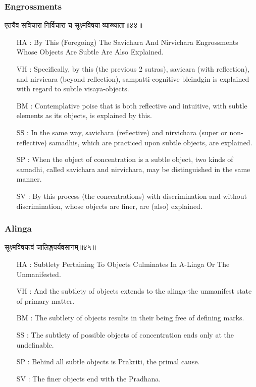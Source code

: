 \begin{frame}[fragile]\frametitle{Engrossments}
\begin{sanskrit}
एतयैव सविचारा निर्विचारा च सूक्ष्मविषया व्याख्याता॥४४॥
\end{sanskrit}

	\begin{itemize}
	\item [HA]: By This (Foregoing) The Savichara And Nirvichara Engrossments Whose Objects Are Subtle Are Also Explained.
	\item [VH]: Specifically, by this (the previous 2 sutras), savicara (with reflection), and nirvicara (beyond reflection), sampatti-cognitive bleindgin is explained with regard to subtle visaya-objects.
	\item [BM]: Contemplative poise that is both reflective and intuitive, with subtle elements as its objects, is explained by this.
	\item [SS]: In the same way, savichara (reflective) and nirvichara (super or non-reflective) samadhis, which are practiced upon subtle objects, are explained.
	\item [SP]: When the object of concentration is a subtle object, two kinds of samadhi, called savichara and nirvichara, may be distinguished in the same manner.
	\item [SV]: By this process (the concentrations) with discrimination and without discrimination, whose objects are finer, are (also) explained. 
	\end{itemize}
\end{frame}


\begin{frame}[fragile]\frametitle{Alinga}
\begin{sanskrit}
सूक्ष्मविषयत्वं चालिङ्गपर्यवसानम्॥४५॥
\end{sanskrit}

	\begin{itemize}
	\item [HA]: Subtlety Pertaining To Objects Culminates In A-Linga Or The Unmanifested.
	\item [VH]: And the subtlety of objects extends to the alinga-the unmanifest state of primary matter.
	\item [BM]: The subtlety of objects results in their being free of defining marks.
	\item [SS]: The subtlety of possible objects of concentration ends only at the undefinable.
	\item [SP]: Behind all subtle objects is Prakriti, the primal cause.
	\item [SV]: The finer objects end with the Pradhana. 
	\end{itemize}
\end{frame}

